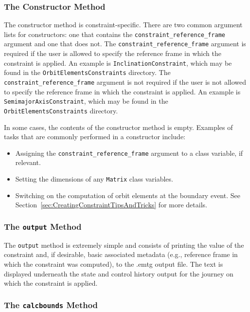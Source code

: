 \documentclass[11pt]{article}
\begin{document}
\subsubsection{The Constructor Method}

The constructor method is constraint-specific. There are two common argument lists for constructors: one that contains the \texttt{constraint\_reference\_frame} argument and one that does not. The \texttt{constraint\_reference\_frame} argument is required if the user is allowed to specify the reference frame in which the constraint is applied. An example is \texttt{InclinationConstraint}, which may be found in the \texttt{OrbitElementsConstraints} directory. The \texttt{constraint\_reference\_frame} argument is not required if the user is not allowed to specify the reference frame in which the constraint is applied. An example is \texttt{SemimajorAxisConstraint}, which may be found in the \texttt{OrbitElementsConstraints} directory.

In some cases, the contents of the constructor method is empty. Examples of tasks that are commonly performed in a constructor include:

\begin{itemize}
	\item Assigning the \texttt{constraint\_reference\_frame} argument to a class variable, if relevant.
	\item Setting the dimensions of any \texttt{Matrix} class variables.
	\item Switching on the computation of orbit elements at the boundary event. See Section~\ref{sec:CreatingConstraintTipsAndTricks} for more details.
\end{itemize}

\subsubsection{The \texttt{output} Method}

The \texttt{output} method is extremely simple and consists of printing the value of the constraint and, if desirable, basic associated metadata (e.g., reference frame in which the constraint was computed), to the .emtg output file. The text is displayed underneath the state and control history output for the journey on which the constraint is applied.  

\subsubsection{The \texttt{calcbounds} Method}
\end{document}
